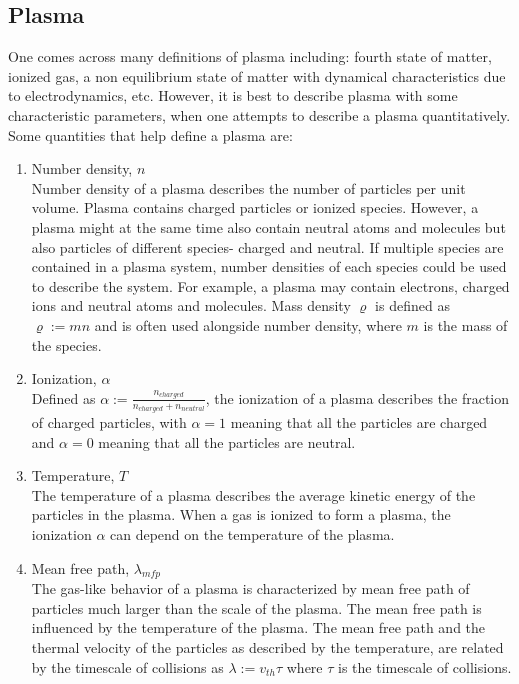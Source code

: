 \documentclass[12pt]{article}
\begin{document}
	\subsection{Plasma}
	One comes across many definitions of plasma including: fourth state of matter, ionized gas, a non equilibrium state of matter with dynamical characteristics due to electrodynamics, etc. However, it is best to describe plasma with some characteristic parameters, when one attempts to describe a plasma quantitatively. Some quantities that help define a plasma are:
	\begin{enumerate}
		\item Number density, $n$ \\
		Number density of a plasma describes the number of particles per unit volume. Plasma contains charged particles or ionized species. However, a plasma might at the same time also contain neutral atoms and molecules but also particles of different species- charged and neutral. If multiple species are contained in a plasma system, number densities of each species could be used to describe the system. For example, a plasma may contain electrons, charged ions and neutral atoms and molecules. Mass density $\varrho$ is defined as $\varrho := m n$ and is often used alongside number density, where $m$ is the mass of the species.
		
		\item Ionization, $\alpha$ \\
		Defined as $\alpha := \frac{\displaystyle n_{charged}}{\displaystyle n_{charged} + n_{neutral}}$, the ionization of a plasma describes the fraction of charged particles, with $\alpha = 1$ meaning that all the particles are charged and $\alpha = 0$ meaning that all the particles are neutral.
		
		\item Temperature, $T$ \\
		The temperature of a plasma describes the average kinetic energy of the particles in the plasma. When a gas is ionized to form a plasma, the ionization $\alpha$ can depend on the temperature of the plasma.
		
		\item Mean free path, $\lambda_{mfp}$ \\
		The gas-like behavior of a plasma is characterized by mean free path of particles much larger than the scale of the plasma. The mean free path is influenced by the temperature of the plasma. The mean free path and the thermal velocity of the particles as described by the temperature, are related by the timescale of collisions as $\lambda := v_{th} \tau$ where $\tau$ is the timescale of collisions. 
		

\end{enumerate}
\end{document}
